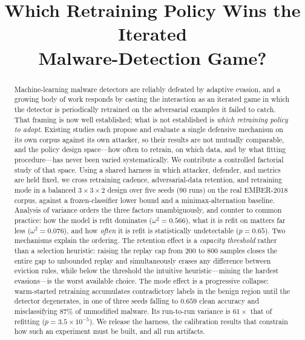 \documentclass[conference]{IEEEtran}
\begin{document}
\title{Which Retraining Policy Wins the Iterated\\Malware-Detection Game?}

\author{
}

\maketitle

\begin{abstract}
Machine-learning malware detectors are reliably defeated by adaptive evasion,
and a growing body of work responds by casting the interaction as an iterated
game in which the detector is periodically retrained on the adversarial
examples it failed to catch. That framing is now well established; what is not
established is \emph{which retraining policy to adopt}. Existing studies each
propose and evaluate a single defensive mechanism on its own corpus against its
own attacker, so their results are not mutually comparable, and the policy
design space---how often to retrain, on which data, and by what fitting
procedure---has never been varied systematically. We contribute a controlled
factorial study of that space. Using a shared harness in which attacker,
defender, and metrics are held fixed, we cross retraining cadence,
adversarial-data retention, and retraining mode in a balanced $3\times3\times2$
design over five seeds ($90$ runs) on the real EMBER-2018 corpus, against a
frozen-classifier lower bound and a minimax-alternation baseline. Analysis of
variance orders the three factors unambiguously, and counter to common
practice: how the model is refit dominates ($\omega^2=0.566$), what it is refit
on matters far less ($\omega^2=0.076$), and how \emph{often} it is refit is
statistically undetectable ($p=0.65$). Two mechanisms explain the ordering. The
retention effect is a \emph{capacity threshold} rather than a selection
heuristic: raising the replay cap from $200$ to $800$ samples closes the entire
gap to unbounded replay and simultaneously erases any difference between
eviction rules, while below the threshold the intuitive heuristic---mining the
hardest evasions---is the worst available choice. The mode effect is a
progressive collapse: warm-started retraining accumulates contradictory labels
in the benign region until the detector degenerates, in one of three seeds
falling to $0.659$ clean accuracy and misclassifying $87\%$ of unmodified
malware. Its run-to-run variance is $61\times$ that of refitting
($p=3.5\times10^{-5}$). We release the harness, the calibration results that
constrain how such an experiment must be built, and all run artifacts.
\end{abstract}
\end{document}
